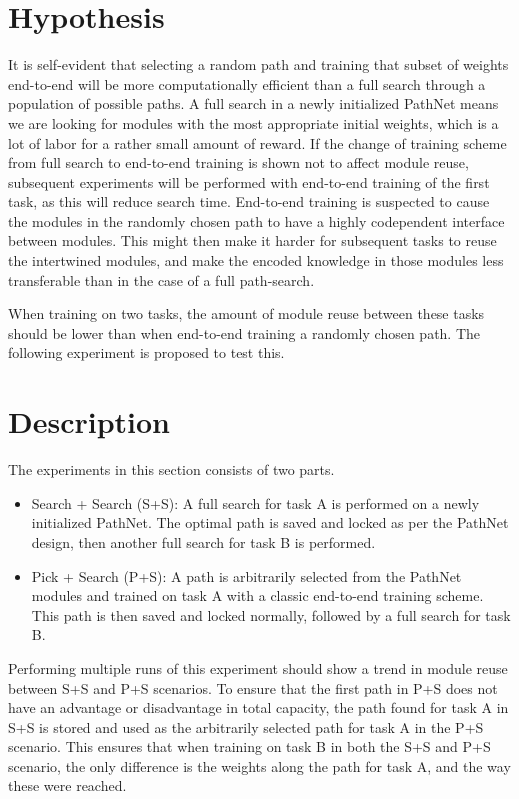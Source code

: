 \section{Hypothesis}
It is self-evident that selecting a random path and training that subset of weights end-to-end will be more computationally efficient than a full search through a population of possible paths. A full search in a newly initialized PathNet means we are looking for modules with the most appropriate initial weights, which is a lot of labor for a rather small amount of reward. If the change of training scheme from full search to end-to-end training is shown not to affect module reuse, subsequent experiments will be performed with end-to-end training of the first task, as this will reduce search time. End-to-end training is suspected to cause the modules in the randomly chosen path to have a highly codependent interface between modules. This might then make it harder for subsequent tasks to reuse the intertwined modules, and make the encoded knowledge in those modules less transferable than in the case of a full path-search. 

When training on two tasks, the amount of module reuse between these tasks should be lower than when end-to-end training a randomly chosen path. The following experiment is proposed to test this.

\section{Description}
The experiments in this section consists of two parts. 
\begin{itemize}
    \item Search + Search (S+S): A full search for task A is performed on a newly initialized PathNet. The optimal path is saved and locked as per the PathNet design, then another full search for task B is performed.
    \item Pick + Search (P+S): A path is arbitrarily selected from the PathNet modules and trained on task A with a classic end-to-end training scheme. This path is then saved and locked normally, followed by a full search for task B.
\end{itemize}
Performing multiple runs of this experiment should show a trend in module reuse between S+S and P+S scenarios. To ensure that the first path in P+S does not have an advantage or disadvantage in total capacity,  the path found for task A in S+S is stored and used as the arbitrarily selected path for task A in the P+S scenario. This ensures that when training on task B in both the S+S and P+S scenario, the only difference is the weights along the path for task A, and the way these were reached. 


